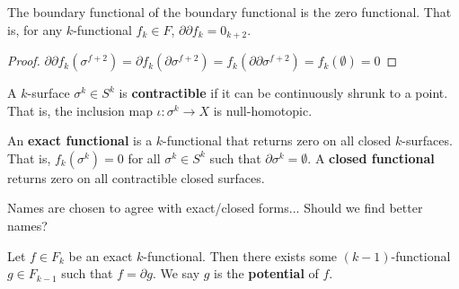 \documentclass[11pt,letterpaper,fleqn]{memoir}
\begin{document}
\begin{coro}
	The boundary functional of the boundary functional is the zero functional. That is, for any $k$-functional $f_k \in F$, $\partial \partial f_k = 0_{k+2}$.
\end{coro}

\begin{proof}
	$\partial \partial f_k (\sigma ^{f+2}) = \partial f_k (\partial \sigma ^{f+2}) = f_k (\partial \partial \sigma ^{f+2}) = f_k(\emptyset) = 0$
\end{proof}

\begin{defn}
	A $k$-surface $\sigma^k \in S^k$ is \textbf{contractible} if it can be continuously shrunk to a point. That is, the inclusion map $\iota : \sigma^k \to X$ is null-homotopic.
\end{defn}

\begin{defn}
	An \textbf{exact functional} is a $k$-functional that returns zero on all closed $k$-surfaces. That is, $f_k(\sigma^k) = 0$ for all $\sigma^k \in S^k$ such that $\partial\sigma^k = \emptyset$. A \textbf{closed functional} returns zero on all contractible closed surfaces.
\end{defn}

\begin{remark}
	Names are chosen to agree with exact/closed forms... Should we find better names?
\end{remark}

\begin{prop}
	Let $f \in F_k$ be an exact $k$-functional. Then there exists some $(k-1)$-functional $g \in F_{k-1}$ such that $f = \partial g$. We say $g$ is the \textbf{potential} of $f$.
\end{prop}
\end{document}
